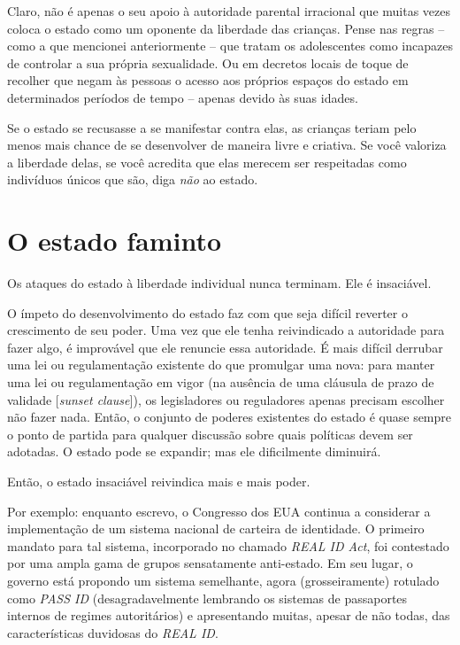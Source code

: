Claro, não é apenas o seu apoio à autoridade parental irracional que muitas vezes coloca o estado como um oponente da liberdade das crianças. Pense nas regras -- como a que mencionei anteriormente -- que tratam os adolescentes como incapazes de controlar a sua própria sexualidade. Ou em decretos locais de toque de recolher que negam às pessoas o acesso aos próprios espaços do estado em determinados períodos de tempo -- apenas devido às suas idades.

Se o estado se recusasse a se manifestar contra elas, as crianças teriam pelo menos mais chance de se desenvolver de maneira livre e criativa. Se você valoriza a liberdade delas, se você acredita que elas merecem ser respeitadas como indivíduos únicos que são, diga \emph{não} ao estado.

\section{O estado faminto}

Os ataques do estado à liberdade individual nunca terminam. Ele é insaciável.

O ímpeto do desenvolvimento do estado faz com que seja difícil reverter o crescimento de seu poder. Uma vez que ele tenha reivindicado a autoridade para fazer algo, é improvável que ele renuncie essa autoridade. É mais difícil derrubar uma lei ou regulamentação existente do que promulgar uma nova: para manter uma lei ou regulamentação em vigor (na ausência de uma cláusula de prazo de validade [\emph{sunset clause}]), os legisladores ou reguladores apenas precisam escolher não fazer nada. Então, o conjunto de poderes existentes do estado é quase sempre o ponto de partida para qualquer discussão sobre quais políticas devem ser adotadas. O estado pode se expandir; mas ele dificilmente diminuirá.

Então, o estado insaciável reivindica mais e mais poder.

Por exemplo: enquanto escrevo, o Congresso dos EUA continua a considerar a implementação de um sistema nacional de carteira de identidade. O primeiro mandato para tal sistema, incorporado no chamado \emph{REAL ID Act}, foi contestado por uma ampla gama de grupos sensatamente anti-estado. Em seu lugar, o governo está propondo um sistema semelhante, agora (grosseiramente) rotulado como \emph{PASS ID} (desagradavelmente lembrando os sistemas de passaportes internos de regimes autoritários) e apresentando muitas, apesar de não todas, das características duvidosas do \emph{REAL ID}.

